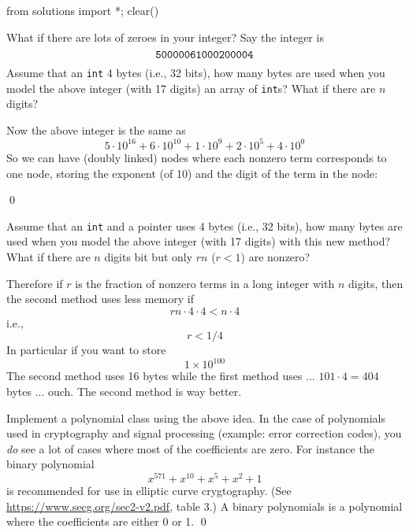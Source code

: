 \begin{python0}
from solutions import *; clear()
\end{python0}

\begin{ex}
What if there are lots of zeroes in your integer?
Say the integer is
\[
\text{\texttt{50000061000200004}}
\]
Assume that an \verb!int! 4 bytes (i.e., 32 bits),
how many bytes are used when you model the above integer (with 17 digits)
an array of \verb!int!s? What if there are $n$ digits?

Now the above integer is the same as
\[
5 \cdot 10^{16} + 6 \cdot 10^{10} + 1 \cdot 10^9 + 2 \cdot 10^5
    + 4 \cdot 10^0
\]
So we can have (doubly linked) nodes where each nonzero term corresponds to
one node, storing the
exponent (of 10) and the digit of the term in the node:


\qed
\end{ex}
Assume that an \verb!int! and a pointer uses 4 bytes (i.e., 32 bits),
how many bytes are used when you model the above integer (with 17 digits)
with this new method? What if there are $n$ digits bit but only $rn$
($r < 1$) are nonzero?

Therefore if $r$ is the fraction of nonzero terms in a long integer
with $n$ digits, then the second method uses less memory if
\[
rn \cdot 4 \cdot 4 < n \cdot 4
\]
i.e.,
\[
r < 1/4
\]
In particular if you want to store
\[
1 \times 10^{100}
\]
The second method uses 16 bytes while the
first method uses ... $101 \cdot 4 = 404$ bytes ... ouch.
The second method is way better.

\begin{ex}
Implement a polynomial class using the above idea.
In the case of polynomials used in cryptography
and signal processing (example: error correction codes),
you \textit{do} see a lot of cases where most of the coefficients are
zero.
For instance the binary polynomial
\[
x^{571} + x^{10} + x^5 + x^2 + 1
\]
is recommended for use in elliptic curve crygtography.
(See \url{https://www.secg.org/sec2-v2.pdf}, table 3.)
A binary polynomials is a polynomial where the
coefficients are either 0 or 1.
\qed
\end{ex}
  
